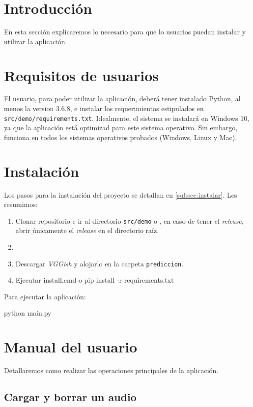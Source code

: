 
\section{Introducción}
En esta sección explicaremos lo necesario para que lo usuarios puedan instalar y utilizar la aplicación.

\section{Requisitos de usuarios}
El usuario, para poder utilizar la aplicación, deberá tener instalado Python, al menos la version 3.6.8, e instalar los requerimientos estipulados en  \texttt{src/demo/requirements.txt}. Idealmente, el sistema se instalará en Windows 10, ya que la aplicación está optimizad para este sistema operativo. Sin embargo, funciona en todos los sistemas operativos probados (Windows, Linux y Mac).

\section{Instalación}
Los pasos para la instalación del proyecto se detallan en \ref{subsec:instalar}. Les resumimos:
\begin{enumerate}
\item Clonar repositorio e ir al directorio \texttt{src/demo} o , en caso de tener el \textit{release}, abrir únicamente el \textit{release} en el directorio raíz.
\item \item Descargar  \textit{VGGish} y alojarlo en la carpeta \texttt{prediccion}.
\item Ejecutar install.cmd o pip install -r requirements.txt
\end{enumerate}

Para ejecutar la aplicación:
\begin{center}
python main.py
\end{center}

\section{Manual del usuario}
Detallaremos como realizar las operaciones principales de la aplicación.

\subsection{Cargar y borrar un audio}

